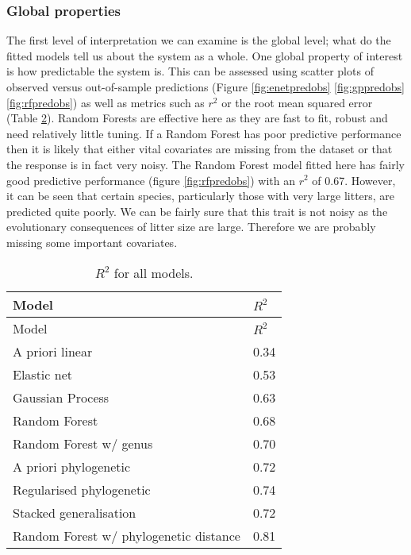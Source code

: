 \documentclass[10pt,]{article}
\begin{document}
\subsubsection{Global properties}\label{global-properties}

The first level of interpretation we can examine is the global level; what do the fitted models tell us about the system as a whole. One global property of interest is how predictable the system is. This can be assessed using scatter plots of observed versus out-of-sample predictions (Figure \ref{fig:enetpredobs} \ref{fig:gppredobs} \ref{fig:rfpredobs}) as well as metrics such as \(r^2\) or the root mean squared error (Table \ref{tbl:allr2}). Random Forests are effective here as they are fast to fit, robust and need relatively little tuning. If a Random Forest has poor predictive performance then it is likely that either vital covariates are missing from the dataset or that the response is in fact very noisy. The Random Forest model fitted here has fairly good predictive performance (figure \ref{fig:rfpredobs}) with an \(r^2\) of 0.67. However, it can be seen that certain species, particularly those with very large litters, are predicted quite poorly. We can be fairly sure that this trait is not noisy as the evolutionary consequences of litter size are large. Therefore we are probably missing some important covariates.

\begin{table}[t!]
\begin{longtable}[c]{@{}ll@{}}
\caption{\(R^2\) for all models. \label{tbl:allr2}}\tabularnewline
\toprule
Model & \(R^2\)\tabularnewline
\midrule
\endfirsthead
\toprule
Model & \(R^2\)\tabularnewline
\midrule
\endhead
A priori linear & 0.34\tabularnewline
Elastic net & 0.53\tabularnewline
Gaussian Process & 0.63\tabularnewline
Random Forest & 0.68\tabularnewline
Random Forest w/ genus & 0.70\tabularnewline
A priori phylogenetic & 0.72\tabularnewline
Regularised phylogenetic & 0.74\tabularnewline
Stacked generalisation & 0.72\tabularnewline
Random Forest w/ phylogenetic distance & 0.81\tabularnewline
\bottomrule
\end{longtable}
\end{table}
\end{document}
